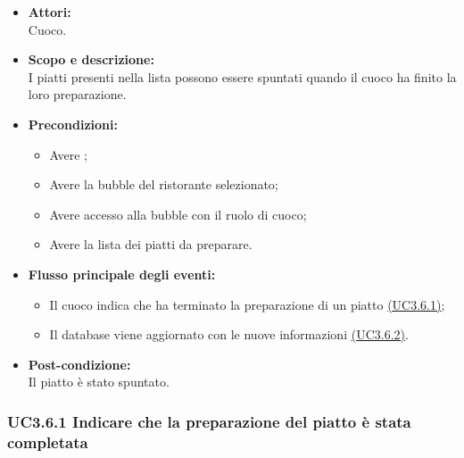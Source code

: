 \begin{itemize}
	\item \textbf{Attori:}
	\\Cuoco.
	\item \textbf{Scopo e descrizione:} 
	\\I piatti presenti nella lista possono essere spuntati quando il cuoco ha finito la loro preparazione.
	\item \textbf{Precondizioni:}
	\begin{itemize}
		\item Avere ;
		\item Avere la bubble del ristorante selezionato;
		\item Avere accesso alla bubble con il ruolo di cuoco;
		\item Avere la lista dei piatti da preparare.
	\end{itemize}
	\item \textbf{Flusso principale degli eventi:}
	\begin{itemize}
		\item Il cuoco indica che ha terminato la preparazione di un piatto \hyperref[UC3.6.1]{(UC3.6.1)};
		\item Il database viene aggiornato con le nuove informazioni \hyperref[UC3.6.2]{(UC3.6.2)}.
	\end{itemize}
	\item \textbf{Post-condizione:}
	\\Il piatto è stato spuntato.
\end{itemize}

\subsubsection{UC3.6.1 Indicare che la preparazione del piatto è stata completata} \label{UC3.6.1}

